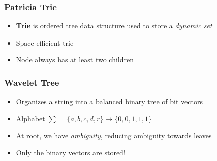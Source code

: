 \documentclass{beamer}
\begin{document}
\begin{frame}
\frametitle{Patricia Trie}
\begin{itemize}
  \item {\bf Trie} is ordered tree data structure used to store a \emph{dynamic set}
  \item Space-efficient trie
  \item Node always has at least two children
\end{itemize}
\begin{figure}
\end{figure}
\end{frame}


\begin{frame}
\frametitle{Wavelet Tree}
\begin{itemize}
  \item Organizes a string into a balanced binary tree of bit vectors
  \item Alphabet $\sum = \{a,b,c,d,r\} \rightarrow \{0, 0, 1, 1, 1\}$
  \item At root, we have \emph{ambiguity}, reducing ambiguity towards leaves
  \item Only the binary vectors are stored!
\end{itemize}
\begin{figure}
\end{figure}
\end{frame}
\end{document}
